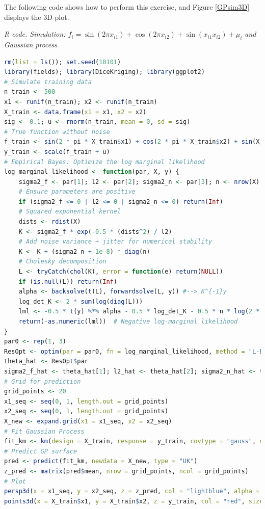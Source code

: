 \begin{enumerate}[leftmargin=*]
	The following code shows how to perform this exercise, and Figure \ref{GPsim3D} displays the 3D plot.
	
\begin{tcolorbox}[enhanced,width=4.67in,center upper,
	fontupper=\large\bfseries,drop shadow southwest,sharp corners]
	\textit{R code. Simulation: $f_i=\sin(2\pi x_{i1}) + \cos(2\pi x_{i2}) + \sin(x_{i1} x_{i2}) + \mu_i$ and Gaussian process}
	\begin{VF}
		\begin{lstlisting}[language=R]
rm(list = ls()); set.seed(10101)
library(fields); library(DiceKriging); library(ggplot2)
# Simulate training data
n_train <- 500
x1 <- runif(n_train); x2 <- runif(n_train)
X_train <- data.frame(x1 = x1, x2 = x2)
sig <- 0.1; u <- rnorm(n_train, mean = 0, sd = sig)
# True function without noise
f_train <- sin(2 * pi * X_train$x1) + cos(2 * pi * X_train$x2) + sin(X_train$x1 * X_train$x2)
y_train <- scale(f_train + u)
# Empirical Bayes: Optimize the log marginal likelihood
log_marginal_likelihood <- function(par, X, y) {
	sigma2_f <- par[1]; l2 <- par[2]; sigma2_n <- par[3]; n <- nrow(X)
	# Ensure parameters are positive
	if (sigma2_f <= 0 | l2 <= 0 | sigma2_n <= 0) return(Inf)
	# Squared exponential kernel
	dists <- rdist(X)
	K <- sigma2_f * exp(-0.5 * (dists^2) / l2)
	# Add noise variance + jitter for numerical stability
	K <- K + (sigma2_n + 1e-8) * diag(n)
	# Cholesky decomposition
	L <- tryCatch(chol(K), error = function(e) return(NULL))
	if (is.null(L)) return(Inf)
	alpha <- backsolve(t(L), forwardsolve(L, y)) #--> K^{-1}y
	log_det_K <- 2 * sum(log(diag(L)))
	lml <- -0.5 * t(y) %*% alpha - 0.5 * log_det_K - 0.5 * n * log(2 * pi)
	return(-as.numeric(lml))  # Negative log-marginal likelihood
}
par0 <- rep(1, 3)
ResOpt <- optim(par = par0, fn = log_marginal_likelihood, method = "L-BFGS-B", lower = c(1e-5, 1e-5), X = X_train, y = y_train)
theta_hat <- ResOpt$par
sigma2_f_hat <- theta_hat[1]; l2_hat <- theta_hat[2]; sigma2_n_hat <- theta_hat[3]
# Grid for prediction 
grid_points <- 20
x1_seq <- seq(0, 1, length.out = grid_points)
x2_seq <- seq(0, 1, length.out = grid_points)
X_new <- expand.grid(x1 = x1_seq, x2 = x2_seq)
# Fit Gaussian Process
fit_km <- km(design = X_train, response = y_train, covtype = "gauss", noise.var = rep(sigma2_n_hat, n_train))
# Predict GP surface
pred <- predict(fit_km, newdata = X_new, type = "UK")
z_pred <- matrix(pred$mean, nrow = grid_points, ncol = grid_points)
# Plot
persp3d(x = x1_seq, y = x2_seq, z = z_pred, col = "lightblue", alpha = 0.7, xlab = "x1", ylab = "x2", zlab = "GP Mean")
points3d(x = X_train$x1, y = X_train$x2, z = y_train, col = "red", size = 8)
\end{lstlisting}
	\end{VF}
\end{tcolorbox}


\end{enumerate}
